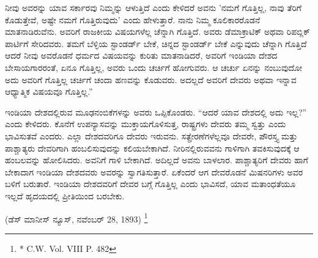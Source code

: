 ನೀವು ಅವರನ್ನು ಯಾವ ಸರ್ಕಾರವು ನಿಮ್ಮನ್ನು ಆಳುತ್ತಿದೆ ಎಂದು ಕೇಳಿದರೆ ಅವನು 'ನಮಗೆ ಗೊತ್ತಿಲ್ಲ, ನಾವು ತೆರಿಗೆ ಕೊಡುತ್ತೇವೆ, ಅಷ್ಟೇ ನಮಗೆ ಗೊತ್ತಿರುವುದು' ಎಂದು ಹೇಳುತ್ತಾರೆ. ನಾನು ನಿಮ್ಮ ಕೂಲಿಕಾರರೊಡನೆ ಮಾತನಾಡಿರುವೆನು. ಅವರಿಗೆ ರಾಜಕೀಯ ವಿಷಯಗಳೆಲ್ಲ ಚೆನ್ನಾಗಿ ಗೊತ್ತಿದೆ. ಅವರು ಡೆಮಾಕ್ರಾಟಿಕ್ ಅಥವಾ ರಿಪಬ್ಲಿಕ್ ಪಾರ್ಟಿಗೆ ಸೇರಿದವರು. ತಮಗೆ ಬೆಳ್ಳಿಯ ಸ್ಟಾಂಡರ್ಡ್ ಬೇಕೆ, ಚಿನ್ನದ ಸ್ಟಾಂಡರ್ಡ್ ಬೇಕೆ ಎನ್ನುವುದು ಚೆನ್ನಾಗಿ ಗೊತ್ತಿದೆ ಆದರೆ ನೀವು ಅವರೊಡನೆ ಧರ್ಮದ ವಿಷಯವನ್ನು ಕುರಿತು ಮಾತನಾಡಿದರೆ, ಅವರಿಗೆ ಇಂಡಿಯಾ ದೇಶದ ಬೇಸಾಯಗಾರರಂತೆ, ಏನೂ ಗೊತ್ತಿಲ್ಲ, ಅವರು ಒಂದು ಚರ್ಚಿಗೆ ಹೋಗುವರು. ಆ ಚರ್ಚು ಏನನ್ನು ನಂಬುವುದೋ ಅದು ಅವರಿಗೆ ಗೊತ್ತಿಲ್ಲ ಚರ್ಚಿಗೆ ಚಂದಾ ಹಣವನ್ನು ಕೊಡುವರು. ಅದಲ್ಲದೆ ಅವರಿಗೆ ದೇವರು ಅಥವಾ ಇನ್ನಾವ ಆಧ್ಯಾತ್ಮಿಕ ವಿಷಯವೂ ಗೊತ್ತಿಲ್ಲ.” 

ಇಂಡಿಯಾ ದೇಶದಲ್ಲಿರುವ ಮೂಢನಂಬಿಕೆಗಳನ್ನು ಅವರು ಒಪ್ಪಿಕೊಂಡರು. “ಆದರೆ ಯಾವ ದೇಶದಲ್ಲಿ ಅದು ಇಲ್ಲ?” ಎಂದು ಕೇಳಿದರು. ಕೊನೆಗೆ ಉಪನ್ಯಾಸವನ್ನು ಮುಕ್ತಾಯಗೊಳಿಸುತ್ತ, ರಾಷ್ಟ್ರಗಳು ದೇವರು ತಮ್ಮ ಸ್ವತ್ತು ಎಂದು ಭಾವಿಸುತವೆ ಎಂದರು. ಎಲ್ಲಾ ದೇಶದವರಿಗೂ ದೇವರು ಇರುವನು. ಸತ್ಪ್ರೇರಣೆಗಳೆಲ್ಲವೂ ದೇವರೇ, ಪೌರಸ್ತ್ಯ ಮತ್ತು ಪಾಶ್ಚಾತ್ಯರು ದೇವರಿಗಾಗಿ ಹಂಬಲಿಸುವುದನ್ನು ಕಲಿಯಬೇಕಾಗಿದೆ. ನೀರಿನಲ್ಲಿರುವವನು ಗಾಳಿಗಾಗಿ ತವಕಿಸುವುದಕ್ಕೆ ಆ ಹಂಬಲವನ್ನು ಹೋಲಿಸಿದರು. ಅವನಿಗೆ ಗಾಳಿ ಬೇಕಾಗಿದೆ. ಅದಿಲ್ಲದೆ ಅವನು ಬಾಳಲಾರ. ಪಾಶ್ಚಾತ್ಯರಿಗೆ ದೇವರು ಹಾಗೆ ಬೇಕಾದಾಗ ಇಂಡಿಯಾ ದೇಶದವರು ಅವರನ್ನು ಸ್ವಾಗತಿಸುತ್ತಾರೆ. ಏಕೆಂದರೆ ಆಗ ದೇವರೊಡನೆ ಮಿಷನರಿಗಳು ಅವರ ಬಳಿಗೆ ಬರುತಾರೆ. ಇಂಡಿಯಾ ದೇಶದವರಿಗೆ ದೇವರ ಬಗ್ಗೆ ಗೊತ್ತಿಲ್ಲ ಎಂದು ಭಾವಿಸದೆ, ಯಾವ ಮತಾಂಧತೆಯೂ ಇಲ್ಲದೆ ಹೃದಯದಲ್ಲಿ ಪ್ರೀತಿಯಿಂದ ಬರಬೇಕು.

\delimiter

\begin{center}
(ಡೆಸ್ ಮಾನೀಸ್ ನ್ಯೂಸ್, ನವೆಂಬರ್ 28, 1893) \footnote{* C.W. Vol. VIII P. 482}
\end{center}

